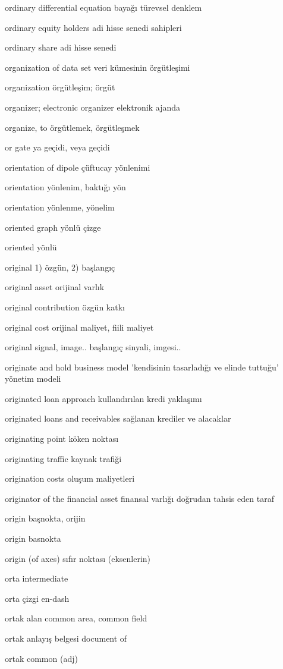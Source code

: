 \documentclass[12pt,fleqn]{article}\usepackage{../../common}
\begin{document}
ordinary differential equation bayağı türevsel denklem

ordinary equity holders adi hisse senedi sahipleri

ordinary share adi hisse senedi

organization of data set veri kümesinin örgütleşimi

organization örgütleşim; örgüt

organizer; electronic organizer elektronik ajanda

organize, to örgütlemek, örgütleşmek

or gate ya geçidi, veya geçidi

orientation of dipole çüftucay yönlenimi

orientation yönlenim, baktığı yön

orientation yönlenme, yönelim

oriented graph yönlü çizge

oriented yönlü

original 1) özgün, 2) başlangıç

original asset orijinal varlık

original contribution özgün katkı

original cost orijinal maliyet, fiili maliyet

original signal, image.. başlangıç sinyali, imgesi..

originate and hold business model 'kendisinin tasarladığı ve elinde tuttuğu' yönetim modeli

originated loan approach kullandırılan kredi yaklaşımı

originated loans and receivables sağlanan krediler ve alacaklar

originating point köken noktası

originating traffic kaynak trafiği

origination costs oluşum maliyetleri

originator of the financial asset finansal varlığı doğrudan tahsis eden taraf

origin başnokta, orijin

origin basnokta

origin (of axes) sıfır noktası (eksenlerin)

orta intermediate

orta çizgi en-dash

ortak alan common area, common field

ortak anlayış belgesi document of

ortak common (adj)
\end{document}
